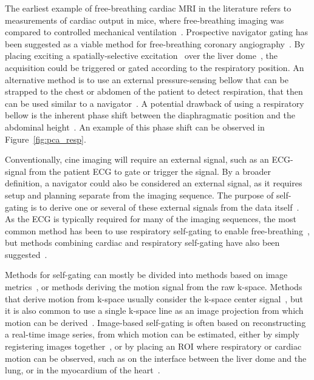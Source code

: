 The earliest example of free-breathing cardiac MRI in the literature refers to measurements of cardiac output in mice, where free-breathing imaging was compared to controlled mechanical ventilation~\cite{Whalen1991}. Prospective navigator gating has been suggested as a viable method for free-breathing coronary angiography~\cite{Danias1997}. By placing exciting a spatially-selective excitation~\cite{Pauly1989} over the liver dome~\cite{McConnell1997}, the acquisition could be triggered or gated according to the respiratory position. An alternative method is to use an external pressure-sensing bellow that can be strapped to the chest or abdomen of the patient to detect respiration, that then can be used similar to a navigator~\cite{Santelli2011}. A potential drawback of using a respiratory bellow is the inherent phase shift between the diaphragmatic position and the abdominal height~\cite{Pengelly1979}. An example of this phase shift can be observed in Figure~\ref{fig:pca_resp}.

Conventionally, cine imaging will require an external signal, such as an ECG-signal from the patient ECG to gate or trigger the signal. By a broader definition, a navigator could also be considered an external signal, as it requires setup and planning separate from the imaging sequence. The purpose of self-gating is to derive one or several of these external signals from the data itself~\cite{Larson2004}. As the ECG is typically required for many of the imaging sequences, the most common method has been to use respiratory self-gating to enable free-breathing~\cite{Larson2005}, but methods combining cardiac and respiratory self-gating have also been suggested~\cite{Larson2003:RSNA, DiSopra2019}.

Methods for self-gating can mostly be divided into methods based on image metrics~\cite{McGee2000,Manduca2000}, or methods deriving the motion signal from the raw k-space. Methods that derive motion from k-space usually consider the k-space center signal~\cite{Buehrer2008}, but it is also common to use a single k-space line as an image projection from which motion can be derived~\cite{Pang2014}. Image-based self-gating is often based on reconstructing a real-time image series\cite{Riederer1988, Nayak2004}, from which motion can be estimated, either by simply registering images together~\cite{Kellman2009, Hansen2012, Xue2013}, or by placing an ROI where respiratory or cardiac motion can be observed, such as on the interface between the liver dome and the lung, or in the myocardium of the heart~\cite{Paul2015}.

